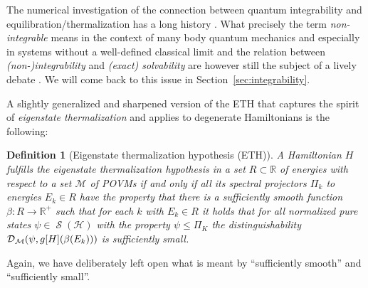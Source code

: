 \documentclass[a4paper,12pt,listof=totoc,index=totoc,bibliography=totoc,headsepline=false,headings=normal,BCOR16.153846mm,DIV12,headinclude,twoside,cleardoublepage=empty,numbers=noenddot,final]{scrreprt}
\theoremstyle{mystyle}
\numberwithin{equation}{section}
\numberwithin{figure}{section}
\numberwithin{lemma}{section}
\numberwithin{theorem}{section}
\numberwithin{corollary}{section}
\newtheorem{definition}{Definition}
\numberwithin{definition}{section}
\numberwithin{conjecture}{section}
\numberwithin{observation}{section}
\newcommand{\+}{\mkern2mu}
\renewcommand{\H}{H}
\newcommand{\rhog}{g}
\newcommand{\tracedistance}[3][]{
  \ifthenelse{\equal{#2}{}}
  {\ifthenelse{\equal{#3}{}}
    {\mathcal{D}_{#1}}{}
  }{
    \ifthenelse{\equal{#1}{}}
    {\operatorname{\mathcal{D}}(#2,#3)}
    {\operatorname{\mathcal{D}}_{#1}(#2,#3)}
  }
}
\DeclareMathOperator{\1}{\mathds{1}}
\newcommand{\POVMs}{\mathcal{M}}
\DeclareMathOperator{\Qst}{\mathcal{S}}
\newcommand{\mc}[1]{\mathcal{#1}}
\newcommand{\mcH}{\mc{H}}
\newcommand{\mb}[1]{\mathbb{#1}}
\newcommand{\R}{\mb{R}}
\begin{document}
The numerical investigation of the connection between quantum integrability and equilibration/thermalization has a long history \cite{Jensen1985}.
What precisely the term \emph{non-integrable} means in the context of many body quantum mechanics and especially in systems without a well-defined classical limit and the relation between \emph{\mbox{(non-)}integrability} and \emph{(exact) solvability} are however still the subject of a lively debate \cite{1111.3375v1,1012.3587v1,Braak11,Fine2013}.
We will come back to this issue in Section~\ref{sec:integrability}.

A slightly generalized and sharpened version of the ETH that captures the spirit of \emph{eigenstate thermalization} and applies to degenerate Hamiltonians is the following:
\begin{definition}[Eigenstate thermalization hypothesis (ETH)] \label{def:eth}
  A Hamiltonian $\H$ fulfills the \emph{eigenstate thermalization hypothesis} in a set $R \subset \R$ of energies with respect to a set $\POVMs$ of POVMs if and only if all its spectral projectors $\Pi_k$ to energies $E_k \in R$ have the property that there is a sufficiently smooth function $\beta\colon R \to \R^+$ such that for each $k$ with $E_k \in R$ it holds that for all normalized pure states $\psi \in \Qst(\mcH)$ with the property $\psi \leq \Pi_K$ the distinguishability $\tracedistance[\POVMs]{\psi}{\rhog[\H](\beta(E_k))}$ is sufficiently small.
\end{definition}
Again, we have deliberately left open what is meant by ``sufficiently smooth'' and ``sufficiently small''.
\end{document}
